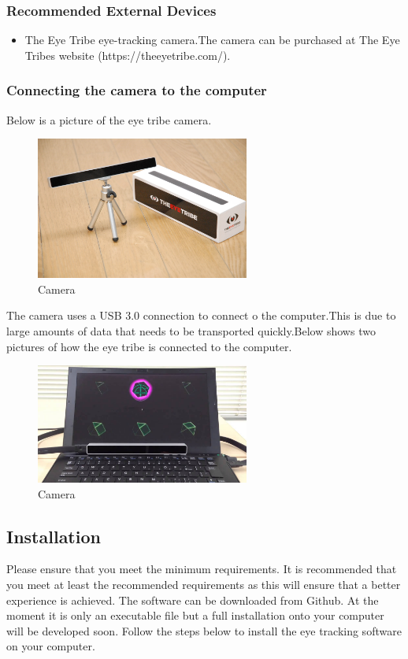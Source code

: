 \subsubsection{Recommended External Devices}
\begin{itemize}
\item The Eye Tribe eye-tracking camera.The camera can be purchased at The Eye Tribes website (https://theeyetribe.com/).
\end{itemize}

\subsubsection{Connecting the camera to the computer}
Below is a picture of the eye tribe camera. 

	\begin{figure}[!ht]
		\centering
		\includegraphics[scale=0.5, width=7cm, keepaspectratio]{./Images/eyetribepicture.jpg}
		\caption{Camera}
		\label{Camera}
	\end{figure}

The camera uses a  USB 3.0 connection to connect o the computer.This is due to large amounts of data that needs to be transported quickly.Below shows two pictures of how the eye tribe is connected to the computer.

\begin{figure}[!ht]
		\centering
		\includegraphics[scale=0.3, width=7cm, keepaspectratio]{./Images/connection.jpg}
		\caption{Camera}
		\label{Camera}
	\end{figure}

		

\subsection{Installation}
Please ensure that you meet the minimum requirements. It is recommended that you meet at least the recommended requirements as this will ensure that a better experience is achieved. The software can be downloaded from Github. At the moment it is only an executable file but a full installation onto your computer will be developed soon. Follow the steps below to install the eye tracking software on your computer.\\

